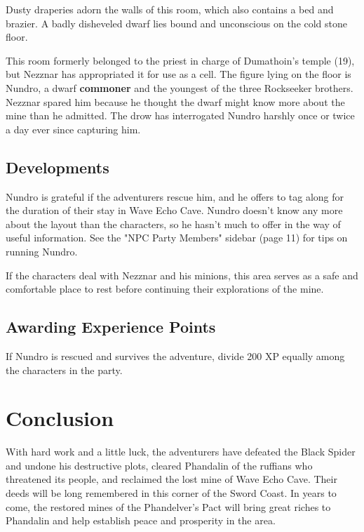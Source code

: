 \documentclass[10pt,a4paper,twoside,bg=print,twocolumn,openany,nodeprecatedcode]{dndbook}
\begin{document}
\begin{DndReadAloud}{}
Dusty draperies adorn the walls of this room, which also contains a bed and brazier. A badly disheveled dwarf lies bound and unconscious on the cold stone floor.

\end{DndReadAloud}

This room formerly belonged to the priest in charge of Dumathoin's temple (19), but Nezznar has appropriated it for use as a cell. The figure lying on the floor is Nundro, a dwarf \textbf{commoner} and the youngest of the three Rockseeker brothers. Nezznar spared him because he thought the dwarf might know more about the mine than he admitted. The drow has interrogated Nundro harshly once or twice a day ever since capturing him.

\subsection{Developments}
Nundro is grateful if the adventurers rescue him, and he offers to tag along for the duration of their stay in Wave Echo Cave. Nundro doesn't know any more about the layout than the characters, so he hasn't much to offer in the way of useful information. See the "NPC Party Members" sidebar (page 11) for tips on running Nundro.

If the characters deal with Nezznar and his minions, this area serves as a safe and comfortable place to rest before continuing their explorations of the mine.

\subsection{Awarding Experience Points}
If Nundro is rescued and survives the adventure, divide 200 XP equally among the characters in the party.

\section{Conclusion}
With hard work and a little luck, the adventurers have defeated the Black Spider and undone his destructive plots, cleared Phandalin of the ruffians who threatened its people, and reclaimed the lost mine of Wave Echo Cave. Their deeds will be long remembered in this corner of the Sword Coast. In years to come, the restored mines of the Phandelver's Pact will bring great riches to Phandalin and help establish peace and prosperity in the area.
\end{document}
